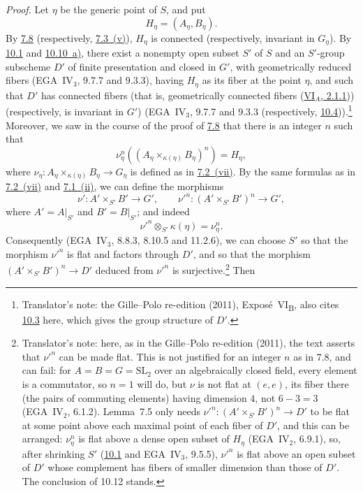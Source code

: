 \emph{Proof.}
Let \(\eta\) be the generic point of \(S\), and put
\[
  H_\eta=(A_\eta,B_\eta).
\]
By \hyperref[prop:sga3-VIB-7.8]{7.8} \textup{(}respectively,
\hyperref[concl:sga3-VIB-7.3-v]{7.3~\textup{(v)}}\textup{)}, \(H_\eta\) is
connected \textup{(}respectively, invariant in \(G_\eta\)\textup{)}. By
\hyperref[par:sga3-VIB-10.1]{10.1} and
\hyperref[par:sga3-VIB-10.10-a]{10.10~a)}, there exist a nonempty open
subset \(S'\) of \(S\) and an \(S'\)-group subscheme \(D'\) of finite
presentation and closed in \(G'\), with geometrically reduced fibers
\textup{(}EGA~IV\(_3\), 9.7.7 and 9.3.3\textup{)}, having \(H_\eta\) as its
fiber at the point \(\eta\), and such that \(D'\) has connected fibers
\textup{(}that is, geometrically connected fibers
\textup{(\hyperref[prop:sga3-VIA-2.1.1]{VI\(_A\), 2.1.1}))}
\textup{(}respectively, is invariant in \(G'\)\textup{)}
\textup{(}EGA~IV\(_3\), 9.7.7 and 9.3.3 \textup{(}respectively,
\hyperref[lem:sga3-VIB-10.4]{10.4}\textup{))}.\footnote{Translator's note: the Gille--Polo re-edition
(2011), Expos\'e~VI\textsubscript{B}, also cites \hyperref[lem:sga3-VIB-10.3]{10.3} here, which gives the group
structure of \(D'\).} Moreover, we saw in the
course of the proof of \hyperref[prop:sga3-VIB-7.8]{7.8} that there is an
integer \(n\) such that
\label{form:sga3-VIB-10.12-generic-image}%
\[
  \nu_\eta^n
  \left((A_\eta\times_{\kappa(\eta)}B_\eta)^n\right)
  =H_\eta,
\]
where \(\nu_\eta:A_\eta\times_{\kappa(\eta)}B_\eta\to G_\eta\) is defined as in
\hyperref[def:sga3-VIB-7.2-vii]{7.2~\textup{(vii)}}. By the same formulas as in
\hyperref[def:sga3-VIB-7.2-vii]{7.2~\textup{(vii)}} and
\hyperref[concl:sga3-VIB-7.1-ii]{7.1~\textup{(ii)}}, we can define the morphisms
\label{form:sga3-VIB-10.12-nu-prime}%
\[
  \nu':A'\times_{S'}B'\longrightarrow G',
  \qquad
  {\nu'}^n:(A'\times_{S'}B')^n\longrightarrow G',
\]
where \(A'=A|_{S'}\) and \(B'=B|_{S'}\); and indeed
\[
  {\nu'}^n\otimes_{S'}\kappa(\eta)=\nu_\eta^n.
\]
Consequently \textup{(}EGA~IV\(_3\), 8.8.3, 8.10.5 and 11.2.6\textup{)}, we
can choose \(S'\) so that the morphism \({\nu'}^n\) is flat and factors
through \(D'\), and so that the morphism \((A'\times_{S'}B')^n\to D'\)
deduced from \({\nu'}^n\) is surjective.\footnote{Translator's note: here, as in the Gille--Polo
re-edition (2011), the text asserts that \({\nu'}^n\) can be made flat. This is not justified for an integer \(n\) as
in 7.8, and can fail: for \(A=B=G=\mathrm{SL}_2\) over an algebraically closed field, every element is a
commutator, so \(n=1\) will do, but \(\nu\) is not flat at \((e,e)\), its fiber there (the pairs of commuting
elements) having dimension \(4\), not \(6-3=3\) (EGA~IV\(_2\), 6.1.2). Lemma~7.5 only needs
\({\nu'}^n\colon(A'\times_{S'}B')^n\to D'\) to be flat at some point above each maximal point of each fiber of
\(D'\), and this can be arranged: \(\nu_\eta^n\) is flat above a dense open subset of \(H_\eta\)
(EGA~IV\(_2\), 6.9.1), so, after shrinking \(S'\) (\hyperref[par:sga3-VIB-10.1]{10.1} and EGA~IV\(_3\), 9.5.5),
\({\nu'}^n\) is flat above an open subset of \(D'\) whose complement has fibers of smaller dimension than those of
\(D'\). The conclusion of 10.12 stands.} Then
